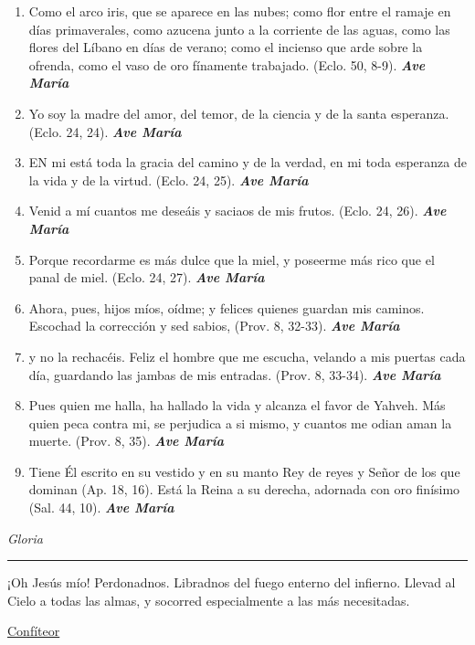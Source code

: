 \documentclass[a4paper,11pt, oneside]{report}
\begin{document}
{{\begin{enumerate}
        \item Como el arco iris, que se aparece en las nubes; como flor entre el ramaje en días primaverales, como azucena junto
        a la corriente de las aguas, como las flores del Líbano en días de verano; como el incienso que arde sobre la ofrenda,
        como el vaso de oro fínamente trabajado. (Eclo. 50, 8-9). \textbf{\textit{Ave María}}

        \item Yo soy la madre del amor, del temor, de la ciencia y de la santa esperanza. 
        (Eclo. 24, 24). \textbf{\textit{Ave María}}

        \item EN mi está toda la gracia del camino y de la verdad, en mi toda esperanza de la vida y de la virtud. 
        (Eclo. 24, 25). \textbf{\textit{Ave María}}

        \item Venid a mí cuantos me deseáis y saciaos de mis frutos. 
        (Eclo. 24, 26). \textbf{\textit{Ave María}}

        \item Porque recordarme es más dulce que la miel, y poseerme más rico que el panal de miel. 
        (Eclo. 24, 27). \textbf{\textit{Ave María}}

        \item Ahora, pues, hijos míos, oídme; y felices quienes guardan mis caminos. Escochad la corrección y sed sabios, 
        (Prov. 8, 32-33). \textbf{\textit{Ave María}}

        \item y no la rechacéis. Feliz el hombre que me escucha, velando a mis puertas cada día, guardando las jambas de mis entradas. 
        (Prov. 8, 33-34). \textbf{\textit{Ave María}}

        \item Pues quien me halla, ha hallado la vida y alcanza el favor de Yahveh. Más quien peca contra mi, se perjudica a si mismo,
        y cuantos me odian aman la muerte. (Prov. 8, 35). \textbf{\textit{Ave María}}

        \item Tiene Él escrito en su vestido y en su manto Rey de reyes y Señor de los que dominan (Ap. 18, 16).
        Está la Reina a su derecha, adornada con oro finísimo (Sal. 44, 10). \textbf{\textit{Ave María}}
      \end{enumerate}      

      \indent\textit{Gloria} \par      

      \begin{center}\rule{1\linewidth}{\linethickness}\end{center}      

      \medskip
      \hypertarget{finalCoronacion}{¡Oh Jesús mío! Perdonadnos. Libradnos del fuego enterno del infierno. Llevad al Cielo a todas las almas, y socorred especialmente a las más 
      necesitadas.}
    }

  \par\bigskip
  \hyperlink{sec:confiteor}{Confíteor}
}
      
\end{document}

